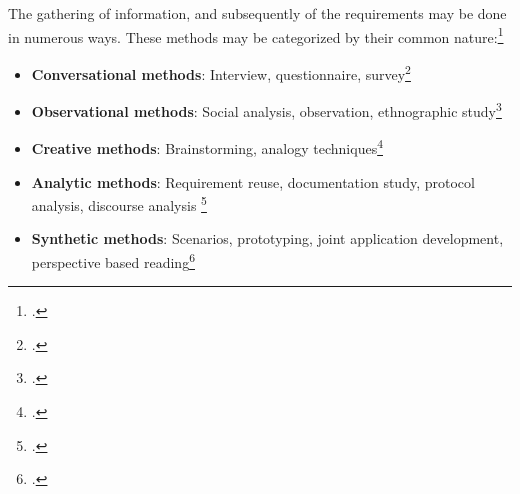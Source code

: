 The gathering of information, and subsequently of the requirements may be done in numerous ways. These methods may be categorized by their common nature:\footcite[Cf.][p.170]{HickeyElicitationtechniqueselection2003} 
\begin{itemize}
    \item \textbf{Conversational methods}: Interview, questionnaire, survey\footcites[Cf.][chapter 3]{PohlRequirementsengineeringfundamentals2011}[cf.][p.170]{HickeyElicitationtechniqueselection2003}
    \item \textbf{Observational methods}: Social analysis, observation, ethnographic study\footcites[Cf.][p.227]{ZhangEffectiverequirementsdevelopmentA2007}[cf.][p.173]{HickeyElicitationtechniqueselection2003}
    \item \textbf{Creative methods}: Brainstorming, analogy techniques\footcite[Cf.][chapter 3]{PohlRequirementsengineeringfundamentals2011}
    \item \textbf{Analytic methods}: Requirement reuse, documentation study, protocol analysis, discourse analysis \footcites[Cf.][p.12]{GoguenTechniquesrequirementelicitation1993}[cf.][pp.227-228]{ZhangEffectiverequirementsdevelopmentA2007}[cf.][p.2]{TiwariMethodologySelectionRequirement2017}
    \item \textbf{Synthetic methods}: Scenarios, prototyping, joint application development, perspective based reading\footcites[Cf.][p.228]{ZhangEffectiverequirementsdevelopmentA2007}[cf.][chapter 3]{PohlRequirementsengineeringfundamentals2011}[cf.][p.3]{TiwariMethodologySelectionRequirement2017}
\end{itemize}

